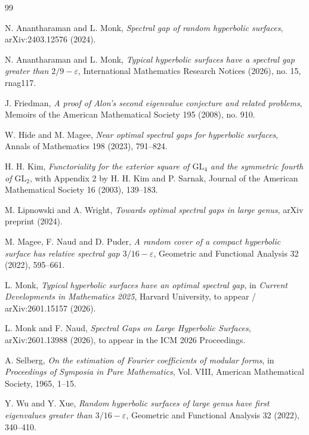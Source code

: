 \documentclass[9pt]{article}
\begin{document}
\begin{thebibliography}{99}\scriptsize

N. Anantharaman and L. Monk,
\emph{Spectral gap of random hyperbolic surfaces},
arXiv:2403.12576 (2024).

N. Anantharaman and L. Monk,
\emph{Typical hyperbolic surfaces have a spectral gap greater than $2/9-\varepsilon$},
International Mathematics Research Notices (2026), no. 15, rnag117.

J. Friedman,
\emph{A proof of Alon's second eigenvalue conjecture and related problems},
Memoirs of the American Mathematical Society 195 (2008), no. 910.

W. Hide and M. Magee,
\emph{Near optimal spectral gaps for hyperbolic surfaces},
Annals of Mathematics 198 (2023), 791--824.

H. H. Kim,
\emph{Functoriality for the exterior square of $\mathrm{GL}_4$ and the symmetric fourth of $\mathrm{GL}_2$},
with Appendix 2 by H. H. Kim and P. Sarnak,
Journal of the American Mathematical Society 16 (2003), 139--183.

M. Lipnowski and A. Wright,
\emph{Towards optimal spectral gaps in large genus},
arXiv preprint (2024).

M. Magee, F. Naud and D. Puder,
\emph{A random cover of a compact hyperbolic surface has relative spectral gap $3/16-\varepsilon$},
Geometric and Functional Analysis 32 (2022), 595--661.

L. Monk,
\emph{Typical hyperbolic surfaces have an optimal spectral gap},
in \emph{Current Developments in Mathematics 2025}, Harvard University, to appear / arXiv:2601.15157 (2026).

L. Monk and F. Naud,
\emph{Spectral Gaps on Large Hyperbolic Surfaces},
arXiv:2601.13988 (2026), to appear in the ICM 2026 Proceedings.

A. Selberg,
\emph{On the estimation of Fourier coefficients of modular forms},
in \emph{Proceedings of Symposia in Pure Mathematics}, Vol. VIII,
American Mathematical Society, 1965, 1--15.

Y. Wu and Y. Xue,
\emph{Random hyperbolic surfaces of large genus have first eigenvalues greater than $3/16-\varepsilon$},
Geometric and Functional Analysis 32 (2022), 340--410.

\end{thebibliography}
\end{document}
